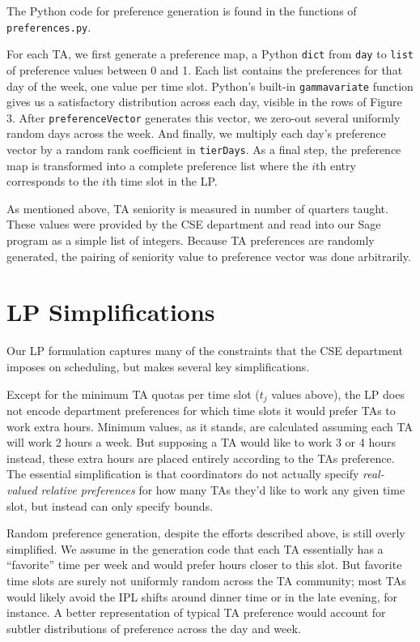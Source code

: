 \documentclass{article}
\begin{document}
\begin{multicols}{2}
The Python code for preference generation is found in the functions of \texttt{preferences.py}.

For each TA, we first generate a preference map, a Python \texttt{dict} from \texttt{day} to \texttt{list} of preference values between 0 and 1. Each list contains the preferences for that day of the week, one value per time slot. Python's built-in \texttt{gammavariate} function gives us a satisfactory distribution across each day, visible in the rows of Figure 3. After \texttt{preferenceVector} generates this vector, we zero-out several uniformly random days across the week. And finally, we multiply each day's preference vector by a random rank coefficient in \texttt{tierDays}. As a final step, the preference map is transformed into a complete preference list where the $i$th entry corresponds to the $i$th time slot in the LP.

As mentioned above, TA seniority is measured in number of quarters taught. These values were provided by the CSE department and read into our Sage program as a simple list of integers. Because TA preferences are randomly generated, the pairing of seniority value to preference vector was done arbitrarily.

\section*{LP Simplifications}

Our LP formulation captures many of the constraints that the CSE department imposes on scheduling, but makes several key simplifications.

Except for the minimum TA quotas per time slot ($t_j$ values above), the LP does not encode department preferences for which time slots it would prefer TAs to work extra hours. Minimum values, as it stands, are calculated assuming each TA will work 2 hours a week. But supposing a TA would like to work 3 or 4 hours instead, these extra hours are placed entirely according to the TAs preference. The essential simplification is that coordinators do not actually specify \textit{real-valued relative preferences} for how many TAs they'd like to work any given time slot, but instead can only specify bounds.

Random preference generation, despite the efforts described above, is still overly simplified. We assume in the generation code that each TA essentially has a ``favorite'' time per week and would prefer hours closer to this slot. But favorite time slots are surely not uniformly random across the TA community; most TAs would likely avoid the IPL shifts around dinner time or in the late evening, for instance. A better representation of typical TA preference would account for subtler distributions of preference across the day and week.


\end{multicols}
\end{document}
